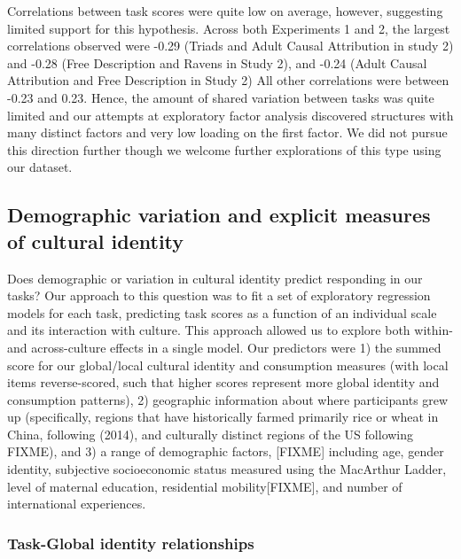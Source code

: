 \documentclass[
  man]{apa6}
\begin{document}
Correlations between task scores were quite low on average, however, suggesting limited support for this hypothesis. Across both Experiments 1 and 2, the largest correlations observed were -0.29 (Triads and Adult Causal Attribution in study 2) and -0.28 (Free Description and Ravens in Study 2), and -0.24 (Adult Causal Attribution and Free Description in Study 2) All other correlations were between -0.23 and 0.23. Hence, the amount of shared variation between tasks was quite limited and our attempts at exploratory factor analysis discovered structures with many distinct factors and very low loading on the first factor. We did not pursue this direction further though we welcome further explorations of this type using our dataset.

\hypertarget{demographic-variation-and-explicit-measures-of-cultural-identity}{%
\subsection{Demographic variation and explicit measures of cultural identity}\label{demographic-variation-and-explicit-measures-of-cultural-identity}}

Does demographic or variation in cultural identity predict responding in our tasks? Our approach to this question was to fit a set of exploratory regression models for each task, predicting task scores as a function of an individual scale and its interaction with culture. This approach allowed us to explore both within- and across-culture effects in a single model. Our predictors were 1) the summed score for our global/local cultural identity and consumption measures (with local items reverse-scored, such that higher scores represent more global identity and consumption patterns), 2) geographic information about where participants grew up (specifically, regions that have historically farmed primarily rice or wheat in China, following (2014), and culturally distinct regions of the US following FIXME), and 3) a range of demographic factors, {[}FIXME{]} including age, gender identity, subjective socioeconomic status measured using the MacArthur Ladder, level of maternal education, residential mobility{[}FIXME{]}, and number of international experiences.

\hypertarget{task-global-identity-relationships}{%
\subsubsection{Task-Global identity relationships}\label{task-global-identity-relationships}}
\end{document}
